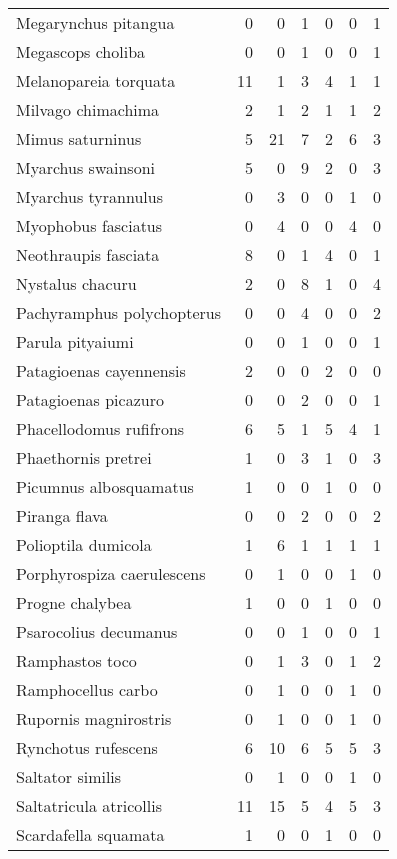 \begin{table}
\begin{tabular}{lrrrrrr}
    Megarynchus pitangua & 0 & 0 & 1 & 0 & 0 & 1 \\ 
    Megascops choliba & 0 & 0 & 1 & 0 & 0 & 1 \\ 
    Melanopareia torquata & 11 & 1 & 3 & 4 & 1 & 1 \\ 
    Milvago chimachima & 2 & 1 & 2 & 1 & 1 & 2 \\ 
    Mimus saturninus & 5 & 21 & 7 & 2 & 6 & 3 \\ 
    Myarchus swainsoni & 5 & 0 & 9 & 2 & 0 & 3 \\ 
    Myarchus tyrannulus & 0 & 3 & 0 & 0 & 1 & 0 \\ 
    Myophobus fasciatus & 0 & 4 & 0 & 0 & 4 & 0 \\ 
    Neothraupis fasciata & 8 & 0 & 1 & 4 & 0 & 1 \\ 
    Nystalus chacuru & 2 & 0 & 8 & 1 & 0 & 4 \\ 
    Pachyramphus polychopterus & 0 & 0 & 4 & 0 & 0 & 2 \\ 
    Parula pityaiumi & 0 & 0 & 1 & 0 & 0 & 1 \\ 
    Patagioenas cayennensis & 2 & 0 & 0 & 2 & 0 & 0 \\ 
    Patagioenas picazuro & 0 & 0 & 2 & 0 & 0 & 1 \\ 
    Phacellodomus rufifrons & 6 & 5 & 1 & 5 & 4 & 1 \\ 
    Phaethornis pretrei & 1 & 0 & 3 & 1 & 0 & 3 \\ 
    Picumnus albosquamatus & 1 & 0 & 0 & 1 & 0 & 0 \\ 
    Piranga flava & 0 & 0 & 2 & 0 & 0 & 2 \\ 
    Polioptila dumicola & 1 & 6 & 1 & 1 & 1 & 1 \\ 
    Porphyrospiza caerulescens & 0 & 1 & 0 & 0 & 1 & 0 \\ 
    Progne chalybea & 1 & 0 & 0 & 1 & 0 & 0 \\ 
    Psarocolius decumanus & 0 & 0 & 1 & 0 & 0 & 1 \\ 
    Ramphastos toco & 0 & 1 & 3 & 0 & 1 & 2 \\ 
    Ramphocellus carbo & 0 & 1 & 0 & 0 & 1 & 0 \\ 
    Rupornis magnirostris & 0 & 1 & 0 & 0 & 1 & 0 \\ 
    Rynchotus rufescens & 6 & 10 & 6 & 5 & 5 & 3 \\ 
    Saltator similis & 0 & 1 & 0 & 0 & 1 & 0 \\ 
    Saltatricula atricollis & 11 & 15 & 5 & 4 & 5 & 3 \\ 
    Scardafella squamata & 1 & 0 & 0 & 1 & 0 & 0 \\ 

\end{tabular}
\end{table}

